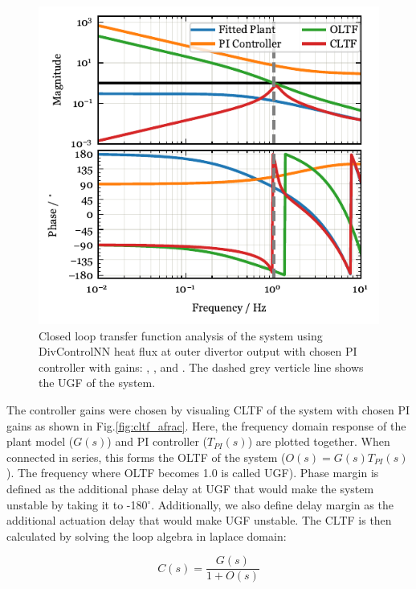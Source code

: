 \begin{figure}[!h]
 \centering
 \includegraphics[width=\linewidth]{figures/SM_LoopStability.pdf}
 \caption{Closed loop transfer function analysis of the system using DivControlNN heat flux at outer divertor output with chosen PI controller with gains: \SMKp, \SMTi, and \SMstau.
The dashed grey verticle line shows the \ac{UGF} of the system.}
\label{fig:cltf_sm}
\end{figure}

The controller gains were chosen by visualing \ac{CLTF} of the system with chosen PI gains as shown in Fig.\ref{fig:cltf_afrac}.
Here, the frequency domain response of the plant model ($G(s)$) and PI controller ($T_{PI}(s)$) are plotted together.
When connected in series, this forms the \ac{OLTF} of the system ($O(s) = G(s) T_{PI}(s)$).
The frequency where \ac{OLTF} becomes 1.0 is called \ac{UGF}).
Phase margin is defined as the additional phase delay at \ac{UGF} that would make the system unstable by taking it to -180$^\circ$.
Additionally, we also define delay margin as the additional actuation delay that would make \ac{UGF} unstable.
The \ac{CLTF} is then calculated by solving the loop algebra in laplace domain:

\begin{equation}
    C(s) = \frac{G(s)}{1 + O(s)}
\label{eq:cltf}
\end{equation}

